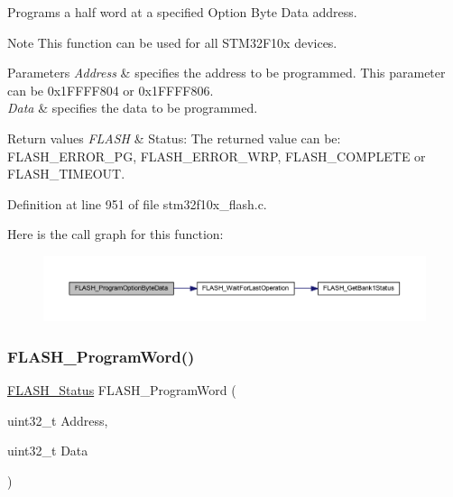 Programs a half word at a specified Option Byte Data address. 

\begin{DoxyNote}{Note}
This function can be used for all S\+T\+M32\+F10x devices. 
\end{DoxyNote}

\begin{DoxyParams}{Parameters}
{\em Address} & specifies the address to be programmed. This parameter can be 0x1\+F\+F\+F\+F804 or 0x1\+F\+F\+F\+F806. \\
\hline
{\em Data} & specifies the data to be programmed. \\
\hline
\end{DoxyParams}

\begin{DoxyRetVals}{Return values}
{\em F\+L\+A\+SH} & Status\+: The returned value can be\+: F\+L\+A\+S\+H\+\_\+\+E\+R\+R\+O\+R\+\_\+\+PG, F\+L\+A\+S\+H\+\_\+\+E\+R\+R\+O\+R\+\_\+\+W\+RP, F\+L\+A\+S\+H\+\_\+\+C\+O\+M\+P\+L\+E\+TE or F\+L\+A\+S\+H\+\_\+\+T\+I\+M\+E\+O\+UT. \\
\hline
\end{DoxyRetVals}


Definition at line 951 of file stm32f10x\+\_\+flash.\+c.

Here is the call graph for this function\+:
\nopagebreak
\begin{figure}[H]
\begin{center}
\leavevmode
\includegraphics[width=350pt]{group___f_l_a_s_h___exported___functions_ga1382ff9d4ded8a5c076fde4fff529d21_cgraph}
\end{center}
\end{figure}
\mbox{\label{group___f_l_a_s_h___exported___functions_gaac9a2f400b92537bd42a6bd7cc237b11}} 
\subsubsection{\texorpdfstring{F\+L\+A\+S\+H\+\_\+\+Program\+Word()}{FLASH\_ProgramWord()}}
{\footnotesize\ttfamily \hyperlink{group___f_l_a_s_h___exported___types_gadc63a6f3404ff1f71229a66915e9cdc0}{F\+L\+A\+S\+H\+\_\+\+Status} F\+L\+A\+S\+H\+\_\+\+Program\+Word (\begin{DoxyParamCaption}\item[{uint32\+\_\+t}]{Address,  }\item[{uint32\+\_\+t}]{Data }\end{DoxyParamCaption})}



